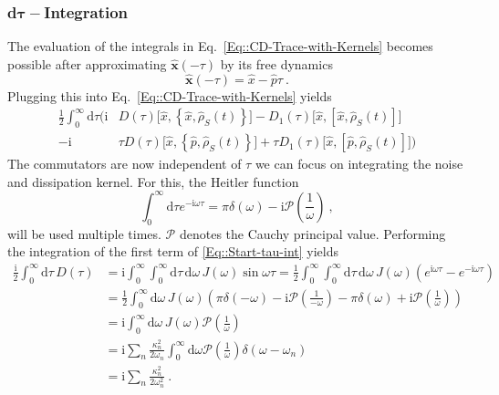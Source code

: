 	\subsubsection{d$\boldsymbol{\tau}-$Integration}
	The evaluation of the integrals in Eq.~\eqref{Eq::CD-Trace-with-Kernels} becomes possible after approximating $\boldsymbol{\hat{x}}(-\tau)$ by its free dynamics
	\begin{equation}
		\boldsymbol{\hat{x}}(-\tau) =	\hat{x} - \hat{p} \tau~.
	\end{equation}
	Plugging this into Eq.~\eqref{Eq::CD-Trace-with-Kernels} yields
	\begin{equation} \label{Eq::Start-tau-int}
		\begin{split}
			\frac{1}{2} \int_{0}^{\infty} \text{d}\tau \Bigg({\mathrm{i}}& D(\tau) \Big[\hat{x}, \left\{\hat{x}, \hat{\rho}_S(t)\right\} \Big] - D_1(\tau) \Big[\hat{x}, \left[{\hat{x}} , \hat{\rho}_S(t)\right]\Big] \\
			- {\mathrm{i}}& \tau D(\tau) \Big[\hat{x}, \left\{\hat{p}, \hat{\rho}_S(t)\right\} \Big] + \tau D_1(\tau) \Big[\hat{x}, \left[\hat{p} , \hat{\rho}_S(t)\right]\Big] \Bigg)
		\end{split}
	\end{equation}
	The commutators are now independent of $\tau$ we can focus on integrating the noise and dissipation kernel. For this, the Heitler function
	\begin{equation}
		\int_0^\infty \text{d} \tau e^{-\mathrm{i} \omega \tau} =	\pi \delta(\omega) - \mathrm{i} \mathcal{P} \left(\frac{1}{\omega}\right)~,
	\end{equation}
	will be used multiple times. $\mathcal{P}$ denotes the Cauchy principal value. Performing the integration of the first term of \eqref{Eq::Start-tau-int} yields
	\begin{equation}
		\begin{split}
			\frac{\mathrm{i}}{2} \int_0^\infty \text{d}\tau\, D(\tau) &= \mathrm{i}\int_0^\infty \int_{0}^{\infty} \text{d}\tau\,	 \text{d}\omega\, J(\omega) \sin \omega \tau = \frac{1}{2} \int_0^\infty \int_{0}^{\infty} \text{d}\tau\, \text{d}\omega\, J(\omega) \left(e^{\mathrm{i} \omega \tau} - e^{-\mathrm{i}\omega \tau}\right) \\
			&= \frac{1}{2} \int_0^\infty \text{d}\omega\, J(\omega) \left(\pi \delta(-\omega) - \mathrm{i} \mathcal{P}\left(\frac{1}{-\omega}\right) - \pi \delta(\omega) + \mathrm{i} \mathcal{P} \left(\frac{1}{\omega}\right)\right) \\
			&= \mathrm{i} \int_0^\infty \text{d} \omega\, J(\omega) \mathcal{P} \left(\frac{1}{\omega}\right) \\
			&=	\mathrm{i} \sum_n \frac{\kappa_n^2}{2 \omega_n} \int_0^\infty \text{d} \omega  \mathcal{P} \left(\frac{1}{\omega}\right)	 \delta(\omega - \omega_n) \\
			&=	\mathrm{i} \sum_n \frac{\kappa_n^2}{2 \omega_n^2}~.
		\end{split}
	\end{equation}
